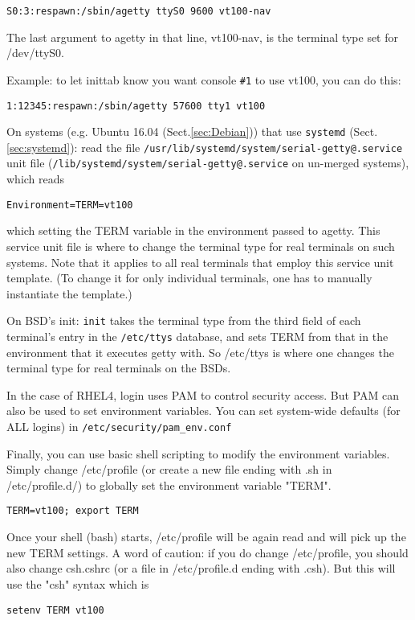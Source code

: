 \begin{verbatim}
S0:3:respawn:/sbin/agetty ttyS0 9600 vt100-nav
\end{verbatim}
The last argument to agetty in that line, vt100-nav, is the terminal type set
for /dev/ttyS0. 

Example: to let inittab know you want console \verb!#1! to use vt100, you can do
this:
\begin{verbatim}
1:12345:respawn:/sbin/agetty 57600 tty1 vt100
\end{verbatim}
  
On systems (e.g. Ubuntu 16.04 (Sect.\ref{sec:Debian})) that use \verb!systemd!
(Sect.\ref{sec:systemd}): 
read the file \verb!/usr/lib/systemd/system/serial-getty@.service! unit file
(\verb!/lib/systemd/system/serial-getty@.service! on un-merged systems), which
reads 
\begin{verbatim}
Environment=TERM=vt100
\end{verbatim}
which setting the TERM variable in the environment passed to agetty. 
This service unit file is where to change the terminal type for real terminals
on such systems. Note that it applies to all real terminals that employ this
service unit template. (To change it for only individual terminals, one has to
manually instantiate the template.)  


On BSD's init: \verb!init! takes the terminal type from the third field of each
terminal's entry in the \verb!/etc/ttys! database, and sets TERM from that in
the environment that it executes getty with. So /etc/ttys is where one changes the
terminal type for real terminals on the BSDs.

In the case of RHEL4, login uses PAM to control security access. But PAM can
also be used to set environment variables. You can set system-wide defaults (for
ALL logins) in \verb!/etc/security/pam_env.conf!


Finally, you can use basic shell scripting to modify the environment variables.
Simply change /etc/profile (or create a new file ending with .sh in
/etc/profile.d/) to globally set the environment variable "TERM".
\begin{verbatim}
TERM=vt100; export TERM
\end{verbatim}
Once your shell (bash) starts, /etc/profile will be again read and will pick up
the new TERM settings. A word of caution: if you do change /etc/profile, you
should also change csh.cshrc (or a file in /etc/profile.d ending with .csh). But
this will use the "csh" syntax which is 
\begin{verbatim}
setenv TERM vt100
\end{verbatim}

